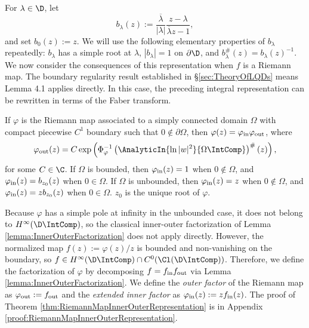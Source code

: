 \documentclass{article}
\numberwithin{equation}{section}
\begin{document}
For $\lambda\in\D$, let $$b_{\lambda}(z):=\frac{\overline{\lambda}}{|\lambda|}\frac{z-\lambda}{\overline{\lambda}z-1},$$
and set $b_0(z):=z$. We will use the following elementary properties of $b_\lambda$ repeatedly: $b_\lambda$ has a simple root at $\lambda$, $|b_\lambda|=1$ on $\partial\D$, and $b_\lambda^{\#}(z)=b_\lambda(z)^{-1}$.
\\

We now consider the consequences of this representation when $f$ is a Riemann map. The boundary regularity result established in \S\ref{sec:TheoryOfLQDs} means Lemma 4.1 applies directly. In this case, the preceding integral representation can be rewritten in terms of the Faber transform.
\begin{theorem}\label{thm:RiemannMapInnerOuterRepresentation}
If $\varphi$ is the Riemann map associated to a simply connected domain $\Omega$ with compact piecewise $C^1$ boundary such that $0\notin\partial\Omega$, then $\varphi(z)=\varphi_{\rm in}\varphi_{\rm out}$, where
\begin{equation}\label{eqn:RiemannMapInnerOuterRepresentation}
    \varphi_{\rm out}(z)=C\exp\left(\Phi_{\varphi}^{-1}\left(\AnalyticIn{\ln|w|^2}{\Omega\IntComp}\right)^{\#}(z)\right),
\end{equation}
for some $C\in\C$. If $\Omega$ is bounded, then $\varphi_{\rm in}(z)=1$ when $0\notin\Omega$, and $\varphi_{\rm in}(z)=b_{z_0}(z)$ when $0\in\Omega$. If $\Omega$ is unbounded, then $\varphi_{\rm in}(z)=z$ when $0\notin\Omega$, and $\varphi_{\rm in}(z)=zb_{z_0}(z)$ when $0\in\Omega$. $z_0$ is the unique root of $\varphi$.
\end{theorem}
Because $\varphi$ has a simple pole at infinity in the unbounded case, it does not belong to $H^\infty(\D\IntComp)$, so the classical inner-outer factorization of Lemma \ref{lemma:InnerOuterFactorization} does not apply directly. However, the normalized map $f(z) := \varphi(z)/z$ is bounded and non-vanishing on the boundary, so $f \in H^\infty(\D\IntComp) \cap C^0(\Cl(\D\IntComp))$. Therefore, we define the factorization of $\varphi$ by decomposing $f = f_{\rm in}f_{\rm out}$ via Lemma \ref{lemma:InnerOuterFactorization}. We define the \emph{outer factor} of the Riemann map as $\varphi_{\rm out} := f_{\rm out}$ and the \emph{extended inner factor} as $\varphi_{\rm in}(z) := zf_{\rm in}(z)$. The proof of Theorem \ref{thm:RiemannMapInnerOuterRepresentation} is in Appendix \ref{proof:RiemannMapInnerOuterRepresentation}.\\
\end{document}
